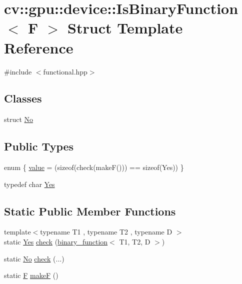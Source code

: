 \hypertarget{structcv_1_1gpu_1_1device_1_1IsBinaryFunction}{\section{cv\-:\-:gpu\-:\-:device\-:\-:Is\-Binary\-Function$<$ F $>$ Struct Template Reference}
\label{structcv_1_1gpu_1_1device_1_1IsBinaryFunction}
}


{\ttfamily \#include $<$functional.\-hpp$>$}

\subsection*{Classes}
\begin{DoxyCompactItemize}
\item 
struct \hyperlink{structcv_1_1gpu_1_1device_1_1IsBinaryFunction_1_1No}{No}
\end{DoxyCompactItemize}
\subsection*{Public Types}
\begin{DoxyCompactItemize}
\item 
enum \{ \hyperlink{structcv_1_1gpu_1_1device_1_1IsBinaryFunction_afa3e026392b656ee527d59a445d324eda27b61fdbe1dbfc4cea1e5305f8044e7b}{value} = (sizeof(check(make\-F())) == sizeof(Yes))
 \}
\item 
typedef char \hyperlink{structcv_1_1gpu_1_1device_1_1IsBinaryFunction_a791b19dc5bfef876ebe0f3b2c966f597}{Yes}
\end{DoxyCompactItemize}
\subsection*{Static Public Member Functions}
\begin{DoxyCompactItemize}
\item 
{\footnotesize template$<$typename T1 , typename T2 , typename D $>$ }\\static \hyperlink{structcv_1_1gpu_1_1device_1_1IsBinaryFunction_a791b19dc5bfef876ebe0f3b2c966f597}{Yes} \hyperlink{structcv_1_1gpu_1_1device_1_1IsBinaryFunction_aef6fa603cfcc6a59f48f830776a7efde}{check} (\hyperlink{structcv_1_1gpu_1_1device_1_1binary__function}{binary\-\_\-function}$<$ T1, T2, D $>$)
\item 
static \hyperlink{structcv_1_1gpu_1_1device_1_1IsBinaryFunction_1_1No}{No} \hyperlink{structcv_1_1gpu_1_1device_1_1IsBinaryFunction_a2d104c906a6a8dcd8ba55f955c7f4277}{check} (...)
\item 
static \hyperlink{calib3d_8hpp_acc93c21c0e709826b318c946961af8fc}{F} \hyperlink{structcv_1_1gpu_1_1device_1_1IsBinaryFunction_a8aec443260ea84279bd80bc56b0038ba}{make\-F} ()
\end{DoxyCompactItemize}


